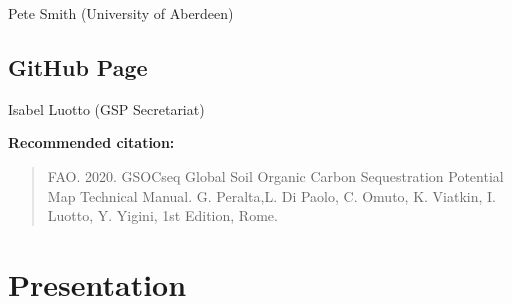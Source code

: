 \documentclass[
  10pt,
  b5paper,
]{book}
\begin{document}
Pete Smith (University of Aberdeen)

\hypertarget{github-page}{%
\section*{GitHub Page}\label{github-page}}

Isabel Luotto (GSP Secretariat)

\vfill

\textbf{Recommended citation:}

\begin{quote}
FAO. 2020. GSOCseq Global Soil Organic Carbon Sequestration Potential Map
Technical Manual. G. Peralta,L. Di Paolo, C. Omuto, K. Viatkin, I. Luotto, Y. Yigini, 1st Edition, Rome.
\end{quote}

\hypertarget{presentation}{%
\chapter{\textbar{} Presentation}\label{presentation}}
\end{document}
